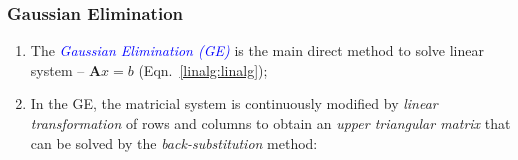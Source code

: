 \documentclass[10pt,compress,handout,ignorenonframetext]{beamer}
\begin{document}
\begin{frame}
  \frametitle{Gaussian Elimination} 
  \begin{enumerate}
     \item <1-> The \textcolor{blue}{\it Gaussian Elimination (GE)} is the main direct method to solve linear system -- $\bm{A}x=b$ (Eqn.~\ref{linalg:linalg});
     \item <2-> In the GE, the matricial system is continuously modified by {\it linear transformation} of rows and columns to obtain an {\it upper triangular matrix} that can be solved by the {\it back-substitution} method:


\end{enumerate}
\end{frame}
\end{document}
